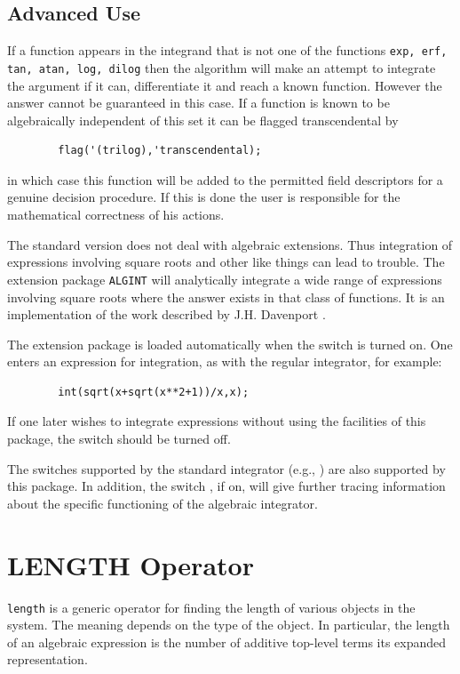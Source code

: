 \subsection{Advanced Use}
\hypertarget{operator:ERF}{}

If a function appears in the integrand that is not one of the functions
\texttt{exp, erf, tan, atan, log, dilog}
then the algorithm will make an
attempt to integrate the argument if it can, differentiate it and reach a
known function.  However the answer cannot be guaranteed in this case.  If
a function is known to be algebraically independent of this set it can be
flagged transcendental by
\begin{verbatim}
        flag('(trilog),'transcendental);
\end{verbatim}
in which case this function will be added to the permitted field
descriptors for a genuine decision procedure. If this is done the user is
responsible for the mathematical correctness of his actions.


The standard version does not deal with algebraic extensions. Thus
integration of expressions involving square roots and other like things
can lead to trouble.  The extension package \texttt{ALGINT}
will analytically integrate a wide range of
expressions involving square roots where the answer exists in that class
of functions. It is an implementation of the work described by J.H.
Davenport \cite{Davenport:81}.

\hypertarget{switch:ALGINT}{}
The extension package is loaded automatically when the switch 
is turned on.
One enters an expression for integration, as with the regular integrator,
for example:
\begin{verbatim}
        int(sqrt(x+sqrt(x**2+1))/x,x);
\end{verbatim}
If one later wishes to integrate expressions without using the facilities of
this package, the switch   should be turned
off.

\hypertarget{switch:TRA}{}
The switches supported by the standard integrator (e.g., )
 are also supported by this package.  In addition, the
switch ,  if on, will give further tracing
information about the specific functioning of the algebraic integrator.



\section{LENGTH Operator}
\hypertarget{operator:LENGTH}{}
\texttt{length} is a generic operator for finding the
length of various objects in the system.  The meaning depends on the type
of the object.  In particular, the length of an algebraic expression is
the number of additive top-level terms its expanded representation.


